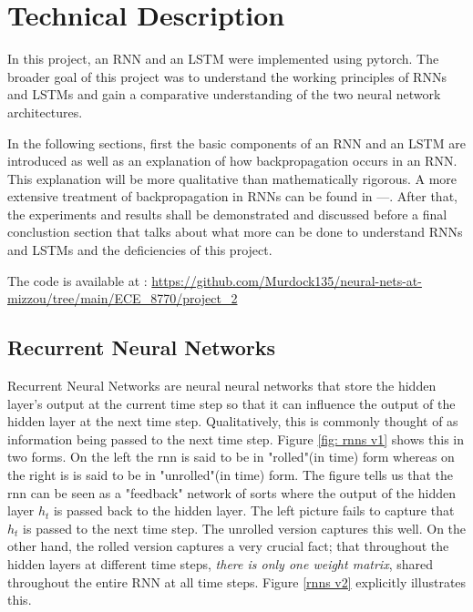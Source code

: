 \documentclass[12pt, letterpaper]{article}
\begin{document}


\section{Technical Description}

In this project, an RNN and an LSTM were implemented using pytorch.
The broader goal of this project was to understand the working principles of
RNNs and LSTMs and gain a comparative understanding of the two neural network
architectures. 

In the following sections, first the basic components of an RNN and an LSTM 
are introduced as well as an explanation of how backpropagation occurs in an 
RNN. This explanation will be more qualitative than mathematically rigorous. 
A more extensive treatment of backpropagation in RNNs can be found in ---. After that, the experiments and results shall be demonstrated and discussed before
a final conclustion section that talks about what more can be done to understand
RNNs and LSTMs and the deficiencies of this project.

The code is available at : \url{https://github.com/Murdock135/neural-nets-at-mizzou/tree/main/ECE_8770/project_2}

\subsection{Recurrent Neural Networks}

Recurrent Neural Networks are neural neural networks that store the 
hidden layer's output at the current time step so that it can influence
the output of the hidden layer at the next time step. Qualitatively,
this is commonly thought of as information being passed to the next time
step. Figure \ref{fig: rnns v1} shows this in two forms. On the left the 
rnn is said to be in "rolled"(in time) form whereas on the right is is said to be 
in "unrolled"(in time) form. The figure tells us that the rnn can be seen as a "feedback"
network of sorts where the output of the hidden layer $h_t$ is passed back to the hidden layer.
The left picture fails to capture that $h_t$ is passed to the next time step. The unrolled 
version captures this well. On the other hand, the rolled version captures a very crucial 
fact; that throughout the hidden layers at different time steps, \textit{there is only 
one weight matrix}, shared throughout the entire RNN at all time steps. Figure \ref{rnns v2} explicitly
illustrates this.
\end{document}
